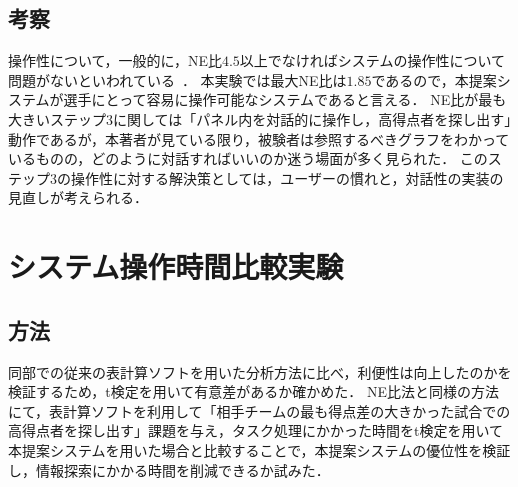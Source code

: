 \documentclass[sotsuron]{kuee}
\begin{document}
		\subsection{考察}
			操作性について，一般的に，NE比$4.5$以上でなければシステムの操作性について問題がないといわれている~\cite{NEMratio}．
			本実験では最大NE比は$1.85$であるので，本提案システムが選手にとって容易に操作可能なシステムであると言える．
			NE比が最も大きいステップ3に関しては「パネル内を対話的に操作し，高得点者を探し出す」動作であるが，本著者が見ている限り，被験者は参照するべきグラフをわかっているものの，どのように対話すればいいのか迷う場面が多く見られた．
			このステップ3の操作性に対する解決策としては，ユーザーの慣れと，対話性の実装の見直しが考えられる．
	\section{システム操作時間比較実験}
		\subsection{方法}
			同部での従来の表計算ソフトを用いた分析方法に比べ，利便性は向上したのかを検証するため，t検定を用いて有意差があるか確かめた．
			NE比法と同様の方法にて，表計算ソフトを利用して「相手チームの最も得点差の大きかった試合での高得点者を探し出す」課題を与え，タスク処理にかかった時間をt検定を用いて本提案システムを用いた場合と比較することで，本提案システムの優位性を検証し，情報探索にかかる時間を削減できるか試みた．
\end{document}
